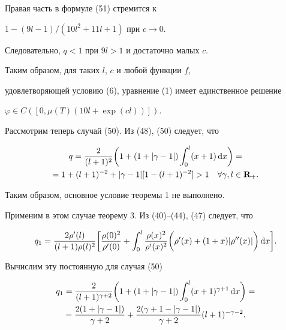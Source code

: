 Правая часть в формуле (51) стремится к


$1-(9l-1)/(10l^2+11l+1)$ при $c\to 0$.


Следовательно, $q<1$ при $9l>1$ и достаточно малых $c$.


Таким образом, для таких $l$, $c$ и любой функции $f$,


удовлетворяющей условию (6), уравнение (1) имеет единственное решение


$\varphi \in C([0,\mu(T)(10l+\exp(cl))])$.





Рассмотрим теперь случай (50). Из (48), (50) следует, что


\begin{multline*}


q= \frac 2{(l+1)^2}\bigg( 1 + (1+|\gamma - 1|)\int_0^l


(x+1)\d x\bigg)=\\


= 1 + (l+1)^{-2} + |\gamma - 1|[1-(l+1)^{-2}] > 1


\q \forall \gamma, l\in \rsp_+.


\end{multline*}


Таким образом, основное условие теоремы 1 не выполнено.


Применим в этом случае теорему 3. Из (40)--(44), (47) следует, что


$$


q_1 = \frac {2\rho'(l)}{(l+1)\rho(l)^2}


\bigg[ \frac {\rho(0)^2}{\rho'(0)} + \int_0^l \frac


{\rho(x)^2}{\rho'(x)^2}


\bigg(


\rho'(x)+ (1+x)|\rho''(x)|\bigg)\d x\bigg].


$$


Вычислим эту постоянную для случая (50)


\begin{multline*}


q_1 = \frac 2{(l+1)^{\gamma+2}}


\bigg( 1 + (1+|\gamma - 1|)\int_0^l (x+1)^{\gamma+1}\d


x\bigg)=\\


= \frac{2(1+|\gamma - 1|)}{\gamma+2}


+ \frac{2(\gamma + 1 - |\gamma - 1|)}{\gamma+2}(l+1)^{-


\gamma-2}.


\end{multline*}


